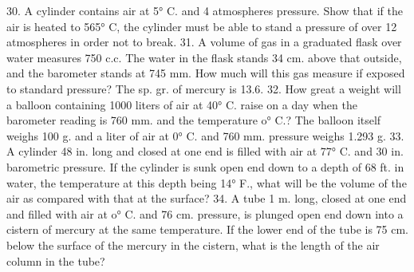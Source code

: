30. A cylinder contains air at 5° C. and 4 atmospheres pressure. Show that if the air is heated to 565° C, the cylinder must be able to stand a pressure of over 12 atmospheres in order not to break.
31. A volume of gas in a graduated flask over water measures 750 c.c. The water in the flask stands 34 cm. above that outside, and the barometer stands at 745 mm. How much will this gas measure if exposed to standard pressure? The sp. gr. of mercury is 13.6.
32. How great a weight will a balloon containing 1000 liters of air at 40° C. raise on a day when the barometer reading is 760 mm. and the temperature o° C.? The balloon itself weighs 100 g. and a liter of air at 0° C. and 760 mm. pressure weighs 1.293 g.
33. A cylinder 48 in. long and closed at one end is filled with air at 77° C. and 30 in. barometric pressure. If the cylinder is sunk open end down to a depth of 68 ft. in water, the temperature at this depth being 14° F., what will be the volume of the air as compared with that at the surface?
34. A tube 1 m. long, closed at one end and filled with air at o° C. and 76 cm. pressure, is plunged open end down into a cistern of mercury at the same temperature. If the lower end of the tube is 75 cm. below the surface of the mercury in the cistern, what is the length of the air column in the tube?